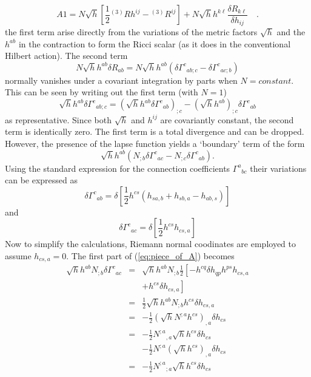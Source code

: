 \documentclass[twocolumn]{article}
\def\.{{\quad .}}
\begin{document}
\[
   A1 = N \sqrt{h} \left[ \frac{1}{2} {}^{(3)}R h^{ij} - {}^{(3)}R^{ij} \right]
        + N \sqrt{h} h^{k \ell} \frac{\delta R_{k \ell}}{\delta h_{ij}} \.
\]
the first term arise directly from the variations of the metric factors $\sqrt{h}$
and the $h^{ab}$ in the contraction to form the Ricci scalar (as it does in
the conventional Hilbert action).
The second term
\[
  N \sqrt{h} h^{ab} \delta R_{ab} = N \sqrt{h} h^{ab}
                                   \left(
                                     \delta {\Gamma^c}_{ab;c} -
                                     \delta {\Gamma^c}_{ac;b}
                                   \right)
\]
normally vanishes under a covariant integration by parts when $N=constant$.  This can
be seen by writing out the first term (with $N=1$)
\[
  \sqrt{h} h^{ab} \delta {\Gamma^c}_{ab;c} = \left(
                                               \sqrt{h} h^{ab} \delta {\Gamma^c}_{ab}
                                             \right)_{;c} -
                                             \left(
                                               \sqrt{h} h^{ab}
                                             \right)_{;c} \delta {\Gamma^c}_{ab}
\]
as representative.
Since both $\sqrt{h}$ and $h^{ij}$ are covariantly constant, the second term is
identically zero.  The first term is a total divergence and can be dropped.
However, the presence of the lapse function yields a `boundary' term of the form
\begin{equation}\label{eq:piece_of_A}
   \sqrt{h} h^{ab} \left(   N_{;b} \delta {\Gamma ^c}_{ac}
                          - N_{;c} \delta {\Gamma ^c}_{ab} \right) .
\end{equation}
Using the standard expression for the connection coefficients
${\Gamma^a}_{bc}$ their variations can be expressed as
\[
   \delta {\Gamma^c}_{ab} = \delta \left[ \frac{1}{2} h^{cs}
                            \left( h_{sa,b} + h_{sb,a} - h_{ab,s} \right) \right]
\]
and \
\[
   \delta {\Gamma^c}_{ac} = \delta \left[ \frac{1}{2} h^{c s} h_{cs,a} \right]
\]
Now to simplify the calculations, Riemann normal coodinates are
employed to assume $h_{cs,a} = 0$.
The first part of
(\ref{eq:piece_of_A}) becomes
\begin{eqnarray}
\sqrt{h} h^{a b} N_{;b} \delta {\Gamma^c}_{ac}
& = & \sqrt{h} h^{a b} N_{;b} \frac{1}{2}
              \left[  -h^{c q} \delta h_{q p} h^{p s} h_{c s,a} \right. \nonumber \\
&   &         \left.  + h^{c s} \delta h_{c s,a} \right]
\nonumber \\
& = &    \frac{1}{2} \sqrt{h} h^{a b} N_{;b} h^{c s} \delta h_{c s, a}
\nonumber \\
& = &   -\frac{1}{2} \left( \sqrt{h} N^{;a} h^{c s} \right)_{,a} \delta h_{c s}
\nonumber \\
& = &   -\frac{1}{2} {N^{;a}}_{,a} \sqrt{h} h^{c s} \delta h_{c s}
\nonumber \\
&   &   - \frac{1}{2} N^{;a} \left( \sqrt{h} h^{c s} \right)_{,a}
\delta h_{c s}
\nonumber \\
& = &   -\frac{1}{2} {N^{;a}}_{;a} \sqrt{h} h^{c s} \delta h_{c s}
\end{eqnarray}
\end{document}
